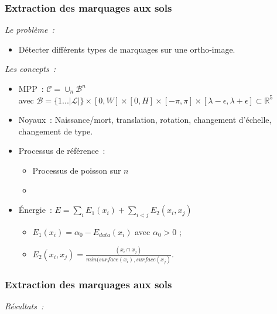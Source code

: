 \documentclass{beamer}
\begin{document}
\begin{frame}
\frametitle{Extraction des marquages aux sols}
\emph{Le probl\`eme~:} 
\begin{itemize}
\item Détecter différents types de marquages sur une ortho-image.
\end{itemize}
\emph{Les concepts~:}
\begin{itemize}
\item MPP~:  $\mathcal{C} = \cup_{n}\mathcal{B}^n$\\
avec $\mathcal{B}=\{1...\vert \mathcal{L}\vert\}\times [0,W]\times[0,H]\times[-\pi,\pi]\times[\lambda-\epsilon,\lambda + \epsilon] \subset  \mathds{R}^{5}$
\item Noyaux~: Naissance/mort, translation, rotation, changement d'échelle, changement de type. 
\item Processus de référence~:
\begin{itemize}
\item Processus de poisson sur $n$
\item \color{red}{Data\&Model driven}
\end{itemize}
\item \'Energie~: $E = \sum_i E_1(x_i) + \sum_{i<j} E_2(x_i,x_j)$
\begin{itemize}
\item $E_1(x_i)=\alpha_{0} - E_{data}(x_i)$ avec $\alpha_{0}>0$ ;
\item $E_2(x_i,x_j) = \frac{(x_i \cap x_j)}{min(surface(x_i),surface(x_j)}$.
\end{itemize}
\end{itemize}
\end{frame}
%
\begin{frame}
\frametitle{Extraction des marquages aux sols}
\emph{R\'esultats~:}
\begin{center}
\begin{figure}[ht]
\end{figure}
\end{center}
\end{frame}
\end{document}
